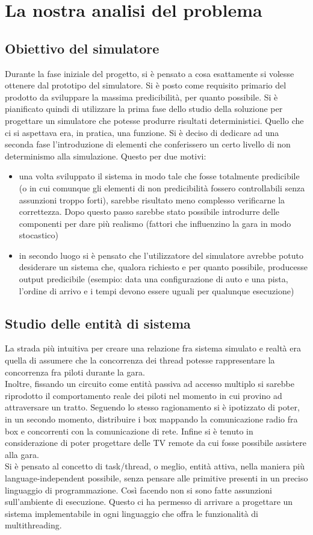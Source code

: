 \section{La nostra analisi del problema}
\subsection{Obiettivo del simulatore}
Durante la fase iniziale del progetto, si è pensato a cosa esattamente si volesse ottenere dal prototipo del simulatore. Si è posto come requisito primario del prodotto da sviluppare la massima predicibilità, per quanto possibile. Si è pianificato quindi di utilizzare la prima fase dello studio della soluzione per progettare un simulatore che potesse produrre risultati deterministici. Quello che ci si aspettava era, in pratica, una funzione. Si è deciso di dedicare ad una seconda fase l'introduzione di elementi che conferissero un certo livello di non determinismo alla simulazione. Questo per due motivi:
\begin{itemize}
               \item una volta sviluppato il sistema in modo tale che fosse totalmente predicibile (o in cui comunque gli elementi di non predicibilità fossero controllabili senza assunzioni troppo forti), sarebbe risultato meno complesso verificarne la correttezza. Dopo questo passo sarebbe stato possibile introdurre delle componenti per dare più realismo (fattori che influenzino la gara in modo stocastico)
                \item in secondo luogo si è pensato che l’utilizzatore del simulatore avrebbe potuto desiderare un sistema che, qualora richiesto e per quanto possibile, producesse output predicibile (esempio: data una configurazione di auto e una pista, l’ordine di arrivo e i tempi devono essere uguali per qualunque esecuzione)
\end{itemize}
\subsection{Studio delle entità di sistema}
La strada più intuitiva per creare una relazione fra sistema simulato e realtà era quella di assumere che la concorrenza dei thread potesse rappresentare la concorrenza fra piloti durante la gara.\\
Inoltre, fissando un circuito come entità passiva ad accesso multiplo si sarebbe riprodotto il comportamento reale dei piloti nel momento in cui provino ad attraversare un tratto.
Seguendo lo stesso ragionamento si è ipotizzato di poter, in un secondo momento, distribuire i box mappando la comunicazione radio fra box e concorrenti con la comunicazione di rete. Infine si è tenuto in considerazione di poter progettare delle TV remote da cui fosse possibile assistere alla gara.\\
Si è pensato al concetto di task/thread, o meglio, entità attiva, nella maniera più language-independent possibile, senza pensare alle primitive presenti in un preciso linguaggio di programmazione. Così facendo non si sono fatte assunzioni sull'ambiente di esecuzione. Questo ci ha permesso di arrivare a progettare un sistema implementabile in ogni linguaggio che offra le funzionalità di multithreading.

